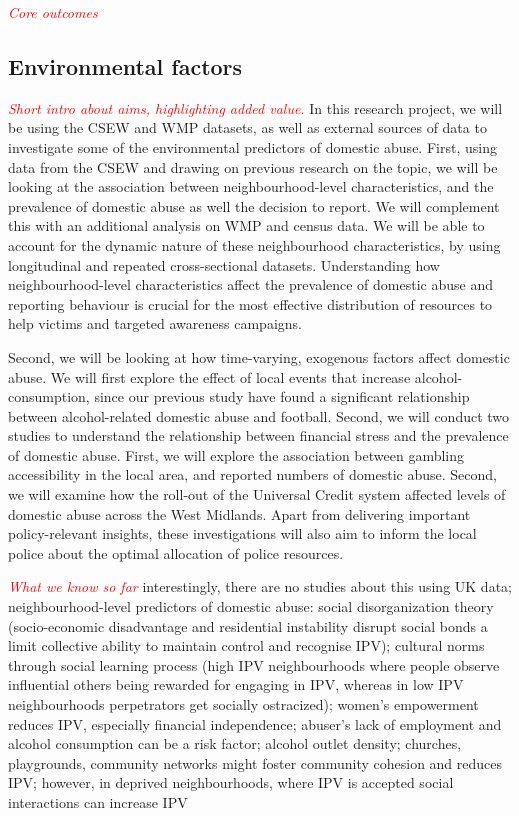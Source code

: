 \documentclass[11pt, a4paper]{article}
\begin{document}
\textcolor{red}{\textit{Core outcomes}}

\newpage

\subsection*{Environmental factors}

\textcolor{red}{\textit{Short intro about aims, highlighting added value.}}
In this research project, we will be using the CSEW and WMP datasets, as well as external sources of data to investigate some of the environmental predictors of domestic abuse. First, using data from the CSEW and drawing on previous research on the topic, we will be looking at the association between neighbourhood-level characteristics, and the prevalence of domestic abuse as well the decision to report. We will complement this with an additional analysis on WMP and census data. We will be able to account for the dynamic nature of these neighbourhood characteristics, by using longitudinal and repeated cross-sectional datasets. Understanding how neighbourhood-level characteristics affect the prevalence of domestic abuse and reporting behaviour is crucial for the most effective distribution of resources to help victims and targeted awareness campaigns. 

Second, we will be looking at how time-varying, exogenous factors affect domestic abuse. We will first explore the effect of local events that increase alcohol-consumption, since our previous study have found a significant relationship between alcohol-related domestic abuse and football. Second, we will conduct two studies to understand the relationship between financial stress and the prevalence of domestic abuse. First, we will explore the association between gambling accessibility in the local area, and reported numbers of domestic abuse. Second, we will examine how the roll-out of the Universal Credit system affected levels of domestic abuse across the West Midlands. Apart from delivering important policy-relevant insights, these investigations will also aim to inform the local police about the optimal allocation of police resources. 



\textcolor{red}{\textit{What we know so far}} interestingly, there are no studies about this using UK data; neighbourhood-level predictors of domestic abuse: social disorganization theory (socio-economic disadvantage and residential instability disrupt social bonds a limit collective ability to maintain control and recognise IPV); cultural norms through social learning process (high IPV neighbourhoods where people observe influential others being rewarded for engaging in IPV, whereas in low IPV neighbourhoods perpetrators get socially ostracized); women's empowerment reduces IPV, especially financial independence;  abuser's lack of employment and alcohol consumption can be a risk factor; alcohol outlet density; churches, playgrounds, community networks might foster community cohesion and reduces IPV;  however, in deprived neighbourhoods, where IPV is accepted social interactions can increase IPV
\end{document}
